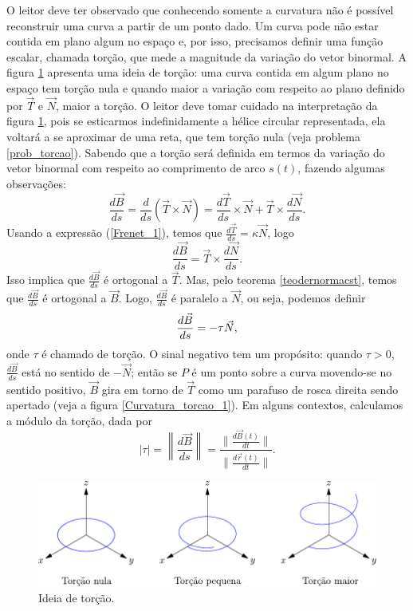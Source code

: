 O leitor deve ter observado que conhecendo somente a curvatura não é possível reconstruir uma curva a partir de um ponto dado. Um curva pode não estar contida em plano algum no espaço e, por isso, precisamos definir uma função escalar, chamada torção, que mede a magnitude da variação do vetor binormal. A figura \ref{torcao} apresenta uma ideia de torção: uma curva contida em algum plano no espaço tem torção nula e quando maior a variação com respeito ao plano definido por $\vec{T}$ e $\vec{N}$, maior a torção. O leitor deve tomar cuidado na interpretação da figura \ref{torcao}, pois se esticarmos indefinidamente a hélice circular representada, ela voltará a se aproximar de uma reta, que tem torção nula (veja problema \ref{prob_torcao}). Sabendo que a torção será definida em termos da variação do vetor binormal com respeito ao comprimento de arco $s(t)$, fazendo algumas observações:
$$
\frac{d\vec{B}}{ds}=\frac{d}{ds}\left(\vec{T}\times\vec{N}\right)=\frac{d\vec{T}}{ds}\times \vec{N}+\vec{T}\times\frac{d\vec{N}}{ds}.
$$
Usando a expressão (\ref{Frenet_1}), temos que $\frac{d\vec{T}}{ds}=\kappa\vec{N}$, logo 
$$
\frac{d\vec{B}}{ds}=\vec{T}\times\frac{d\vec{N}}{ds}.
$$
Isso implica que $\frac{d\vec{B}}{ds}$ é ortogonal a $\vec{T}$. Mas, pelo teorema \ref{teodernormacst}, temos que $\frac{d\vec{B}}{ds}$ é ortogonal a $\vec{B}$. Logo, $\frac{d\vec{B}}{ds}$ é paralelo a $\vec{N}$, ou seja, podemos definir
\begin{equation}{\label{Frenet_2}}
\frac{d\vec{B}}{ds}=-\tau\vec{N},
\end{equation}
onde $\tau$ é chamado de torção. O sinal negativo tem um propósito: quando $\tau>0$, $\frac{d\vec{B}}{ds}$ está no sentido de $-\vec{N}$; então se $P$ é um ponto sobre a curva movendo-se no sentido positivo, $\vec{B}$ gira em torno de $\vec{T}$ como um parafuso de rosca direita sendo apertado (veja a figura \ref{Curvatura_torcao_1}). Em alguns contextos, calculamos a módulo da torção, dada por
$$
|\tau|=\left\|\frac{d\vec{B}}{ds}\right\|=\frac{\|\frac{d\vec{B}(t)}{dt}\|}{\|\frac{d\vec{r}(t)}{dt}\|}.
$$


\begin{figure}
\begin{center}
    \includegraphics{./cap_curvas/figs/exemplos_de_torcao}
 \caption{Ideia de torção.}\label{torcao}
  \end{center}
\end{figure}



